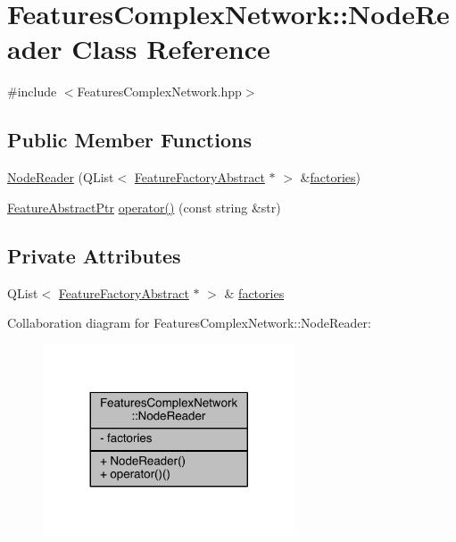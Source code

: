 \hypertarget{class_features_complex_network_1_1_node_reader}{\section{Features\+Complex\+Network\+:\+:Node\+Reader Class Reference}
\label{class_features_complex_network_1_1_node_reader}
}


{\ttfamily \#include $<$Features\+Complex\+Network.\+hpp$>$}

\subsection*{Public Member Functions}
\begin{DoxyCompactItemize}
\item 
\hyperlink{class_features_complex_network_1_1_node_reader_a802901cc6243f8659136c58f8e4caba7}{Node\+Reader} (Q\+List$<$ \hyperlink{class_feature_factory_abstract}{Feature\+Factory\+Abstract} $\ast$ $>$ \&\hyperlink{class_features_complex_network_1_1_node_reader_a488f9f45d6015c0dc00d6a1ff5b04e2a}{factories})
\item 
\hyperlink{class_feature_abstract_ptr}{Feature\+Abstract\+Ptr} \hyperlink{class_features_complex_network_1_1_node_reader_a2d71db12d7b6e13f56ad1c7d665fcd91}{operator()} (const string \&str)
\end{DoxyCompactItemize}
\subsection*{Private Attributes}
\begin{DoxyCompactItemize}
\item 
Q\+List$<$ \hyperlink{class_feature_factory_abstract}{Feature\+Factory\+Abstract} $\ast$ $>$ \& \hyperlink{class_features_complex_network_1_1_node_reader_a488f9f45d6015c0dc00d6a1ff5b04e2a}{factories}
\end{DoxyCompactItemize}


Collaboration diagram for Features\+Complex\+Network\+:\+:Node\+Reader\+:
\nopagebreak
\begin{figure}[H]
\begin{center}
\leavevmode
\includegraphics[width=212pt]{class_features_complex_network_1_1_node_reader__coll__graph}
\end{center}
\end{figure}


